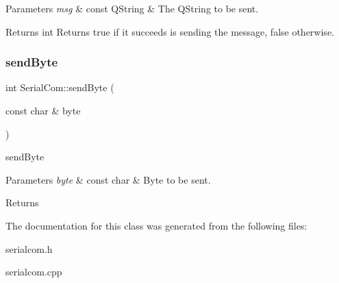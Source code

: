 \begin{DoxyParams}{Parameters}
{\em msg} & const Q\+String \& The Q\+String to be sent. \\
\hline
\end{DoxyParams}
\begin{DoxyReturn}{Returns}
int Returns true if it succeeds is sending the message, false otherwise. 
\end{DoxyReturn}
\mbox{\label{classSerialCom_ab4428cc25df9b3d7e3903a74ae52b30b}} 
\subsubsection{\texorpdfstring{send\+Byte}{sendByte}}
{\footnotesize\ttfamily int Serial\+Com\+::send\+Byte (\begin{DoxyParamCaption}\item[{const char \&}]{byte }\end{DoxyParamCaption})\hspace{0.3cm}{\ttfamily [slot]}}



send\+Byte 


\begin{DoxyParams}{Parameters}
{\em byte} & const char \& Byte to be sent. \\
\hline
\end{DoxyParams}
\begin{DoxyReturn}{Returns}

\end{DoxyReturn}


The documentation for this class was generated from the following files\+:\begin{DoxyCompactItemize}
\item 
serialcom.\+h\item 
serialcom.\+cpp\end{DoxyCompactItemize}
